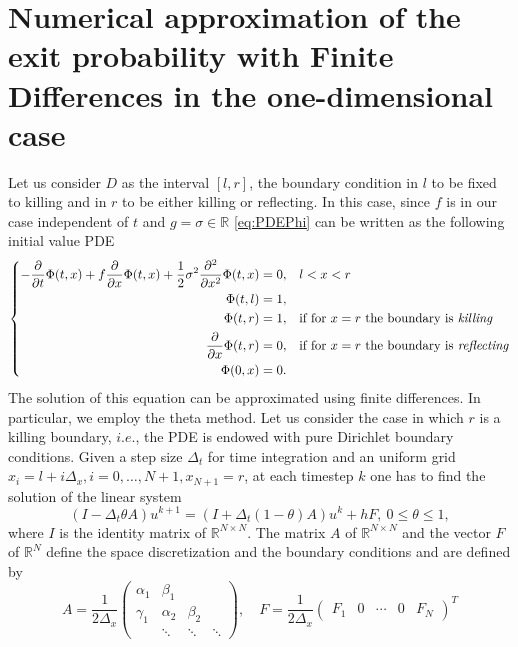 \clearpage
\section{Numerical approximation of the exit probability with Finite Differences in the one-dimensional case}\label{sec:Appendix2}
\renewcommand{\thepage}{\thesection -\arabic{page}}
Let us consider $D$ as the interval $\left[ l,r \right]$, the boundary condition in $l$ to be fixed to killing and in $r$ to be either killing or reflecting. In this case, since $f$ is in our case independent of $t$ and $g = \sigma \in \mathbb{R}$ \eqref{eq:PDEPhi} can be written as the following initial value PDE 
\begin{equation}\label{eq:PDEPhiOneD}
\left \{
\begin{aligned}
	-\frac{\partial}{\partial t} \Phi(t,x) + f\frac{\partial}{\partial x} \Phi(t,x) + \frac{1}{2}\sigma^2 \frac{\partial^2}{\partial x^2} \Phi(t,x) &= 0, && l < x < r \\
	\Phi(t,l) &= 1, \\
	\Phi(t,r) &= 1, && \text{if for $x = r$ the boundary is \textit{killing}} \\
	\frac{\partial}{\partial x}\Phi(t,r) &= 0, && \text{if for $x = r$ the boundary is \textit{reflecting}} \\
	\Phi(0,x) &= 0.
\end{aligned} \right .
\end{equation}
The solution of this equation can be approximated using finite differences. In particular, we employ the theta method. Let us consider the case in which $r$ is a killing boundary, $i.e.$, the PDE is endowed with pure Dirichlet boundary conditions. Given a step size $\Delta_t$ for time integration and an uniform grid $x_i = l + i\Delta_x, i=0,\dots,N+1, x_{N+1} = r$, at each timestep $k$ one has to find the solution of the linear system
\begin{equation}\label{eq:ThetaMethod}
	(I - \Delta_t\theta A) u^{k+1} = (I + \Delta_t(1-\theta) A)u^k + hF, \: 0 \leq \theta \leq 1,
\end{equation}
where $I$ is the identity matrix of $\mathbb{R}^{N\times N}$. The matrix $A$ of $\mathbb{R}^{N\times N}$ and the vector $F$ of $\mathbb{R}^N$ define the space discretization and the boundary conditions and are defined by
\begin{equation}\label{eq:ThetaMethodAandF}
	A = \frac{1}{2\Delta_x}\begin{pmatrix} 	\alpha_1 & \beta_1  &  	      &\\
						\gamma_1 & \alpha_2 & \beta_2 &\\
							 & \ddots   & \ddots  & \ddots \end{pmatrix}, \quad F = \frac{1}{2\Delta_x}\begin{pmatrix} F_1 & 0 & \cdots & 0 & F_N \end{pmatrix}^T
\end{equation}

